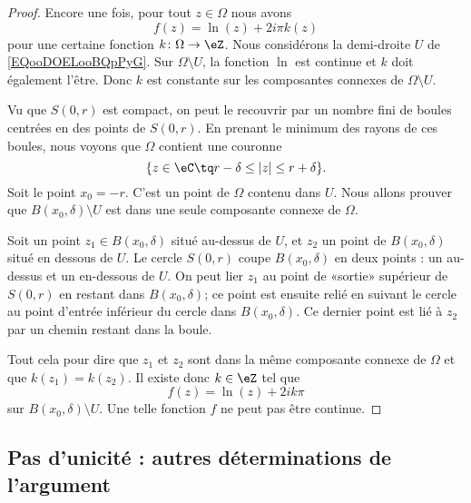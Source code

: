 \begin{proof}
	Encore une fois, pour tout \( z\in \Omega\) nous avons
	\begin{equation}
		f(z)=\ln(z)+2i\pi k(z)
	\end{equation}
	pour une certaine fonction \( k\colon \Omega\to \eZ\). Nous considérons la demi-droite \( U\) de \eqref{EQooDOELooBQpPyG}. Sur \( \Omega\setminus U\), la fonction \( \ln\) est continue et \( k\) doit également l'être. Donc \( k\) est constante sur les composantes connexes de \( \Omega\setminus U\).


	Vu que \( S(0,r)\) est compact, on peut le recouvrir par un nombre fini de boules centrées en des points de \( S(0,r)\). En prenant le minimum des rayons de ces boules, nous voyons que \( \Omega\) contient une couronne
	\begin{equation}
		\{ z\in \eC\tq r-\delta\leq | z |\leq r+\delta \}.
	\end{equation}
	Soit le point \( x_0=-r\). C'est un point de \( \Omega\) contenu dans \( U\). Nous allons prouver que \( B(x_0,\delta)\setminus U\) est dans une seule composante connexe de \( \Omega\).

	Soit un point \( z_1\in B(x_0,\delta)\) situé au-dessus de \( U\), et \( z_2\) un point de \( B(x_0,\delta)\) situé en dessous de \( U\). Le cercle \( S(0,r)\) coupe \( B(x_0,\delta)\) en deux points : un au-dessus et un en-dessous de \( U\). On peut lier \( z_1\) au point de «sortie» supérieur de \( S(0,r)\) en restant dans \( B(x_0,\delta)\); ce point est ensuite relié en suivant le cercle au point d'entrée inférieur du cercle dans \( B(x_0,\delta)\). Ce dernier point est lié à \( z_2\) par un chemin restant dans la boule.

	Tout cela pour dire que \( z_1\) et \( z_2\) sont dans la même composante connexe de \( \Omega\) et que \( k(z_1)=k(z_2)\). Il existe donc \( k\in \eZ\) tel que
	\begin{equation}
		f(z)=\ln(z)+2ik\pi
	\end{equation}
	sur \( B(x_0,\delta)\setminus U\). Une telle fonction \( f\) ne peut pas être continue.
\end{proof}

\subsection{Pas d'unicité : autres déterminations de l'argument}

